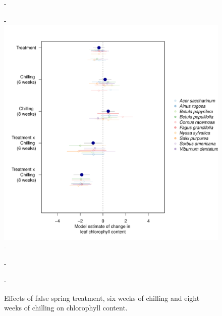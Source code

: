 \documentclass{article}\usepackage[]{graphicx}\usepackage[]{color}
\begin{document}
{\begin{figure} [H]
  -\begin{center}
  -\includegraphics[width=18cm]{..//analyses/figures/chlavg.pdf} 
  -\caption{Effects of false spring treatment, six weeks of chilling and eight weeks of chilling on chlorophyll content. }\label{fig:muchl}
  -\end{center}
  -\end{figure}}
\end{document}
